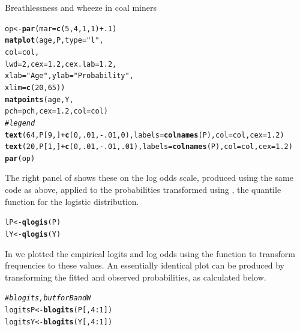 \documentclass[11pt]{book}\usepackage[]{graphicx}\usepackage[]{color}
\makeatletter
\newcommand{\hlnum}[1]{\textcolor[rgb]{0.686,0.059,0.569}{#1}}%
\newcommand{\hlstr}[1]{\textcolor[rgb]{0.192,0.494,0.8}{#1}}%
\newcommand{\hlcom}[1]{\textcolor[rgb]{0.678,0.584,0.686}{\textit{#1}}}%
\newcommand{\hlopt}[1]{\textcolor[rgb]{0,0,0}{#1}}%
\newcommand{\hlstd}[1]{\textcolor[rgb]{0.345,0.345,0.345}{#1}}%
\newcommand{\hlkwb}[1]{\textcolor[rgb]{0.69,0.353,0.396}{#1}}%
\newcommand{\hlkwc}[1]{\textcolor[rgb]{0.333,0.667,0.333}{#1}}%
\newcommand{\hlkwd}[1]{\textcolor[rgb]{0.737,0.353,0.396}{\textbf{#1}}}%
\newenvironment{kframe}{%
 \def\at@end@of@kframe{}%
 \ifinner\ifhmode%
  \def\at@end@of@kframe{\end{minipage}}%
  \begin{minipage}{\columnwidth}%
 \fi\fi%
 \def\FrameCommand##1{\hskip\@totalleftmargin \hskip-\fboxsep
 \colorbox{shadecolor}{##1}\hskip-\fboxsep
     \hskip-\linewidth \hskip-\@totalleftmargin \hskip\columnwidth}%
 \MakeFramed {\advance\hsize-\width
   \@totalleftmargin\z@ \linewidth\hsize
   \@setminipage}}%
 {\par\unskip\endMakeFramed%
 \at@end@of@kframe}
\newenvironment{knitrout}{}{} %
\renewenvironment{knitrout}{\small\renewcommand{\baselinestretch}{.85}}{} %
\makeatother
\begin{document}
\begin{Example}[coalminers]{Breathlessness and wheeze in coal miners}
\begin{knitrout}
\begin{kframe}
\begin{alltt}
\hlstd{op} \hlkwb{<-} \hlkwd{par}\hlstd{(}\hlkwc{mar}\hlstd{=}\hlkwd{c}\hlstd{(}\hlnum{5}\hlstd{,}\hlnum{4}\hlstd{,}\hlnum{1}\hlstd{,}\hlnum{1}\hlstd{)}\hlopt{+}\hlnum{.1}\hlstd{)}
\hlkwd{matplot}\hlstd{(age, P,} \hlkwc{type}\hlstd{=}\hlstr{"l"}\hlstd{,}
  \hlkwc{col}\hlstd{=col,}
  \hlkwc{lwd}\hlstd{=}\hlnum{2}\hlstd{,} \hlkwc{cex}\hlstd{=}\hlnum{1.2}\hlstd{,} \hlkwc{cex.lab}\hlstd{=}\hlnum{1.2}\hlstd{,}
  \hlkwc{xlab}\hlstd{=}\hlstr{"Age"}\hlstd{,} \hlkwc{ylab}\hlstd{=}\hlstr{"Probability"}\hlstd{,}
  \hlkwc{xlim}\hlstd{=}\hlkwd{c}\hlstd{(}\hlnum{20}\hlstd{,}\hlnum{65}\hlstd{))}
\hlkwd{matpoints}\hlstd{(age, Y,}
  \hlkwc{pch}\hlstd{=pch,} \hlkwc{cex}\hlstd{=}\hlnum{1.2}\hlstd{,} \hlkwc{col}\hlstd{=col)}
\hlcom{# legend}
\hlkwd{text}\hlstd{(}\hlnum{64}\hlstd{, P[}\hlnum{9}\hlstd{,]}\hlopt{+} \hlkwd{c}\hlstd{(}\hlnum{0}\hlstd{,}\hlnum{.01}\hlstd{,} \hlopt{-}\hlnum{.01}\hlstd{,} \hlnum{0}\hlstd{),} \hlkwc{labels}\hlstd{=}\hlkwd{colnames}\hlstd{(P),} \hlkwc{col}\hlstd{=col,} \hlkwc{cex}\hlstd{=}\hlnum{1.2}\hlstd{)}
\hlkwd{text}\hlstd{(}\hlnum{20}\hlstd{, P[}\hlnum{1}\hlstd{,]}\hlopt{+} \hlkwd{c}\hlstd{(}\hlnum{0}\hlstd{,}\hlnum{.01}\hlstd{,} \hlopt{-}\hlnum{.01}\hlstd{,} \hlnum{.01}\hlstd{),} \hlkwc{labels}\hlstd{=}\hlkwd{colnames}\hlstd{(P),} \hlkwc{col}\hlstd{=col,} \hlkwc{cex}\hlstd{=}\hlnum{1.2}\hlstd{)}
\hlkwd{par}\hlstd{(op)}
\end{alltt}
\end{kframe}
\end{knitrout}
The right panel of  shows these on the log odds scale, produced
using the same code as above, applied to the probabilities transformed using ,
the quantile function for the logistic distribution.
\begin{knitrout}
\color{fgcolor}\begin{kframe}
\begin{alltt}
\hlstd{lP} \hlkwb{<-} \hlkwd{qlogis}\hlstd{(P)}
\hlstd{lY} \hlkwb{<-} \hlkwd{qlogis}\hlstd{(Y)}
\end{alltt}
\end{kframe}
\end{knitrout}
In  we plotted the empirical logits and log odds using the
function  to transform frequencies to these values.  An essentially
identical plot can be produced by transforming the fitted and observed probabilities,
as calculated below.
\begin{knitrout}
\color{fgcolor}\begin{kframe}
\begin{alltt}
\hlcom{# blogits, but for B and W}
\hlstd{logitsP} \hlkwb{<-} \hlkwd{blogits}\hlstd{(P[,}\hlnum{4}\hlopt{:}\hlnum{1}\hlstd{])}
\hlstd{logitsY} \hlkwb{<-} \hlkwd{blogits}\hlstd{(Y[,}\hlnum{4}\hlopt{:}\hlnum{1}\hlstd{])}
\end{alltt}
\end{kframe}
\end{knitrout}


\end{Example}
\end{document}
